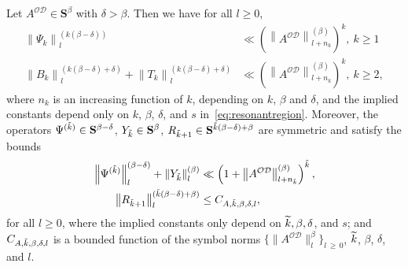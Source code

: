 \documentclass[AHL,Unicode,longabstracts,published]{cedram}
\newcommand{\CD}{\mathcal{D}}
\newcommand{\CO}{\mathcal{O}}
\newcommand{\COD}{{\CO\CD}}
\newcommand{\BS}{\mathbf S}
\newcommand{\snorm}[3]{\left\| #1\right\|_{#3}^{(#2)}}
\let\oldtilde\tilde
\renewcommand*{\tilde}[1]{\mathchoice{\widetilde{#1}}{\widetilde{#1}}{\oldtilde{#1}}{\oldtilde{#1}}}
\begin{document}
\begin{prop}\label{prop:symbolestweakgauge}
Let $A^{\CO\CD}\in\BS^\beta$ with $\delta>\beta$. Then we have for all $l\geq 0$,
\begin{equation}
\begin{split}\label{eq:boundspsilbltlparallelweakgauge}
\snorm{\Psi_k}{k(\beta-\delta)}{l}&\ll \left(\snorm{A^\COD}{\beta}{l+n_k}\right)^k,\ k\geq 1\\
\snorm{B_k}{k(\beta-\delta)+\delta}{l}+\snorm{T_k}{k(\beta-\delta)+\delta}{l}&
\ll \left(\snorm{A^\COD}{\beta}{l+n_k}\right)^k,\ k\geq 2,
\end{split}
\end{equation}
where $n_k$ is an increasing function of $k$, depending on $k$, $\beta$ and $\delta$, and the implied constants depend only on $k$, $\beta$, $\delta$, and $s$ in~\eqref{eq:resonantregion}. Moreover, the operators $\Psi^{(\tilde k)}\in\BS^{\beta-\delta}$, $Y_{\tilde{k}}\in\BS^{\beta}$, $R_{\tilde{k}+1}\in \BS^{\tilde{k}(\beta-\delta)+\beta}$ are symmetric and satisfy the bounds
\begin{equation}\label{eq:estpsiafterparallelgauge}
\begin{aligned}
\left\|\Psi^{(\tilde k)}\right\|^{(\beta-\delta)}_{l}+\snorm{Y_{\tilde{k}}}{\beta}{l}&\ll\left(1+\snorm{A^\COD}{\beta}{l+n_{\tilde{k}}}\right)^{\tilde{k}},\\
\snorm{R_{\tilde{k}+1}}{\tilde{k}(\beta-\delta)+\beta}{l}&\leq C_{A,\tilde{k},\beta,\delta,l},
\end{aligned}
\end{equation}
for all $l\geq 0$, where the implied constants only depend on $\tilde{k}, \beta, \delta$, and $s$; and $C_{A,\tilde{k},\beta,\delta,l}$ is a bounded function of the symbol norms $\lbrace \|A^\COD\|^{\beta}_{l}\rbrace_{l\,\geq\,0}$, $\tilde{k}$, $\beta$, $\delta$, and $l$.
\end{prop}
\end{document}
